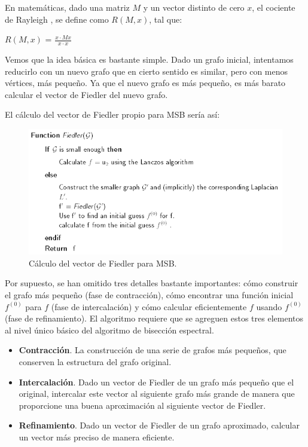 \begin{mydef}\label{Rayleigh}
	En matemáticas, dado una matriz $M$ y un vector distinto de cero $x$, el cociente de Rayleigh , se define como $R(M, x)$, tal que:
	\begin{center}
		$R(M, x)$ = $\frac{x \cdot Mx}{x \cdot x}$
	\end{center}
\end{mydef}


Vemos que la idea básica es bastante simple. Dado un grafo inicial, intentamos reducirlo con un nuevo grafo que en cierto sentido es similar, pero con menos vértices, más pequeño. Ya que el nuevo grafo es más pequeño, es más barato calcular el vector de Fiedler del nuevo grafo.

El cálculo del vector de Fiedler propio para MSB sería así:

\begin{figure}[h]
	\centering
	\includegraphics[scale=0.8]{Figures/fiedler}
	\vspace{1mm}
	\caption{Cálculo del vector de Fiedler para MSB.}
	\label{fiedler}
\end{figure}

Por supuesto, se han omitido tres detalles bastante importantes: cómo construir el grafo más pequeño (fase de contracción), cómo encontrar una función inicial $f^(0)$ para $f$ (fase de intercalación) y cómo calcular eficientemente $f$ usando $f^(0)$ (fase de refinamiento). El algoritmo requiere que se agreguen estos tres elementos al nivel único básico del algoritmo de bisección espectral.

\begin{itemize}
	\item \textbf{Contracción}. La construcción de una serie de grafos más pequeños, que conserven la estructura del grafo original.
	\item \textbf{Intercalación}. Dado un vector de Fiedler de un grafo más pequeño que el original, intercalar este vector al siguiente grafo más grande de manera que proporcione una buena aproximación al siguiente vector de Fiedler.
	\item \textbf{Refinamiento}. Dado un vector de Fiedler de un grafo aproximado, calcular un vector más preciso de manera eficiente.
\end{itemize}

